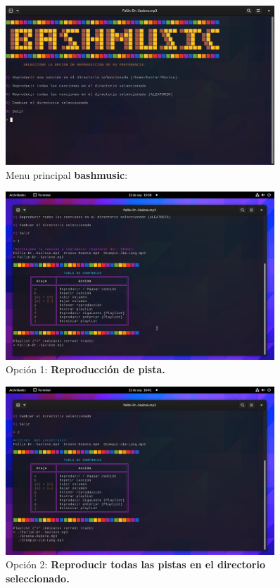 \documentclass[titlepage]{article}
\begin{document}
\begin{figure}[H]
    \centering
    \includegraphics[width=0.9\textwidth]{bashmusic_mp.png}
    \caption{Menu principal \textbf{bashmusic}:}
    \label{fig:ejemplo0}
\end{figure}

\begin{figure}[H]
    \centering
    \includegraphics[width=0.9\textwidth]{bashmusic_1.png}
    \caption{Opción 1:  \textbf{Reproducción de pista.}}
    \label{fig:ejemplo1}
\end{figure}

\begin{figure}[H]
    \centering
    \includegraphics[width=0.9\textwidth]{bashmusic_2.png}
    \caption{Opción 2:  \textbf{Reproducir todas las pistas en el directorio seleccionado.}}
    \label{fig:ejemplo2}
\end{figure}
\end{document}
